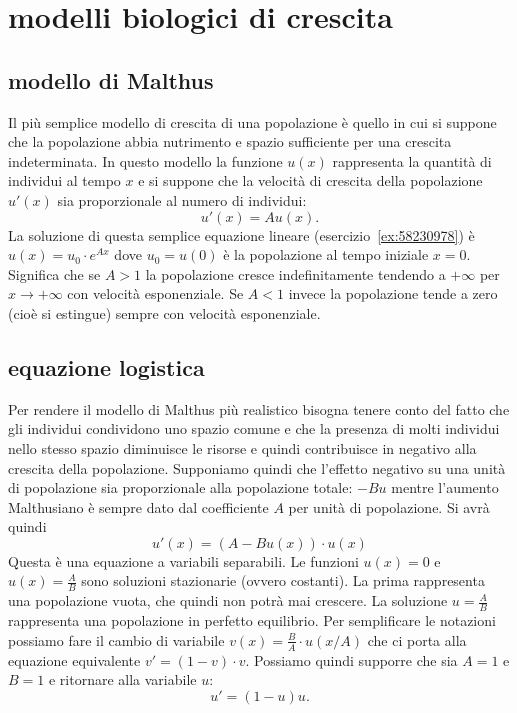 \section{modelli biologici di crescita}
%

\subsection{modello di Malthus}
%
%
%

Il più semplice modello di crescita di una popolazione è quello 
in cui si suppone che la popolazione abbia nutrimento e spazio sufficiente 
per una crescita indeterminata.
In questo modello la funzione $u(x)$ rappresenta la quantità di individui 
al tempo $x$ e si suppone che la velocità di crescita della popolazione $u'(x)$ 
sia proporzionale al numero di individui:
\[
  u'(x) = A u(x).  
\]
La soluzione di questa semplice equazione lineare (esercizio~\ref{ex:58230978})
è $u(x) = u_0\cdot  e^{A x}$ dove $u_0=u(0)$ è la popolazione al tempo 
iniziale $x=0$.
Significa che se $A>1$ la popolazione cresce indefinitamente tendendo 
a $+\infty$ per $x\to +\infty$ con velocità esponenziale.
Se $A<1$ invece la popolazione tende a zero (cioè si estingue)
sempre con velocità esponenziale.

\subsection{equazione logistica}
%
%
%

Per rendere il modello di Malthus più realistico bisogna tenere conto 
del fatto che gli individui condividono uno spazio comune e che 
la presenza di molti individui nello stesso spazio diminuisce le risorse 
e quindi contribuisce in negativo alla crescita della popolazione. 
Supponiamo quindi che l'effetto negativo su una unità di popolazione 
sia proporzionale alla popolazione totale: $-Bu$ mentre l'aumento 
Malthusiano è sempre dato dal coefficiente $A$ per unità di popolazione. 
Si avrà quindi 
\[
  u'(x)  = (A-Bu(x))\cdot u(x)
\]
Questa è una equazione a variabili separabili. 
Le funzioni $u(x) = 0$ e $u(x) = \frac{A}{B}$ sono soluzioni 
stazionarie (ovvero costanti). 
La prima rappresenta una popolazione vuota, che quindi non potrà 
mai crescere. 
La soluzione $u=\frac{A}{B}$ rappresenta una popolazione 
in perfetto equilibrio.
Per semplificare le notazioni possiamo fare il cambio di variabile 
$v(x) = \frac{B}{A}\cdot u(x/A)$ che ci porta alla equazione 
equivalente $v'=(1-v)\cdot v$. 
Possiamo quindi supporre che sia $A=1$ e $B=1$ e ritornare 
alla variabile $u$:
\begin{equation}\label{eq:ode_logistica}
  u' = (1-u) u.  
\end{equation}

